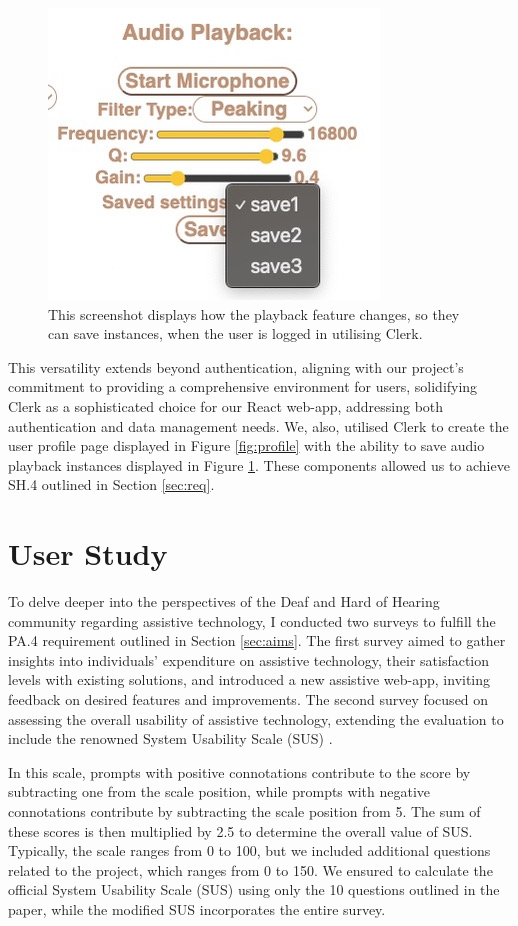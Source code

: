 \documentclass{l4proj}
\begin{document}
\begin{figure}
    \centering
    \includegraphics[width=0.4\linewidth]{dissertation/images/saves.jpeg} 
    \caption{This screenshot displays how the playback feature changes, so they can save instances, when the user is logged in utilising Clerk.}
    \label{fig:saves} 
\end{figure}

This versatility extends beyond authentication, aligning with our project's commitment to providing a comprehensive environment for users, solidifying Clerk as a sophisticated choice for our React web-app, addressing both authentication and data management needs. We, also, utilised Clerk to create the user profile page displayed in Figure \ref{fig:profile} with the ability to save audio playback instances displayed in Figure \ref{fig:saves}. These components allowed us to achieve SH.4 outlined in Section \ref{sec:req}.

\chapter{User Study}
\label{sec:user-study}

To delve deeper into the perspectives of the Deaf and Hard of Hearing community regarding assistive technology, I conducted two surveys to fulfill the PA.4 requirement outlined in Section \ref{sec:aims}. The first survey aimed to gather insights into individuals' expenditure on assistive technology, their satisfaction levels with existing solutions, and introduced a new assistive web-app, inviting feedback on desired features and improvements. The second survey focused on assessing the overall usability of assistive technology, extending the evaluation to include the renowned System Usability Scale (SUS) \cite{SUS}. 

In this scale, prompts with positive connotations contribute to the score by subtracting one from the scale position, while prompts with negative connotations contribute by subtracting the scale position from 5. The sum of these scores is then multiplied by 2.5 to determine the overall value of SUS. Typically, the scale ranges from 0 to 100, but we included additional questions related to the project, which ranges from 0 to 150. We ensured to calculate the official System Usability Scale (SUS) using only the 10 questions outlined in the paper, while the modified SUS incorporates the entire survey.
\end{document}
